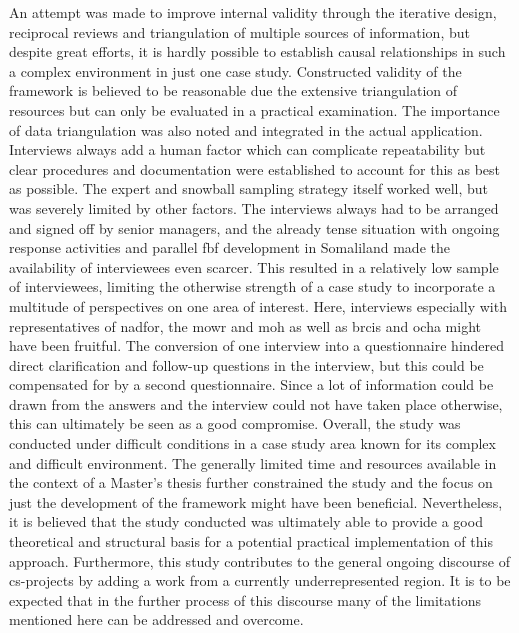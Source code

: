 An attempt was made to improve internal validity through the iterative design, reciprocal reviews and triangulation of multiple sources of information, but despite great efforts, it is hardly possible to establish causal relationships in such a complex environment in just one case study. Constructed validity of the framework is believed to be reasonable due the extensive triangulation of resources but can only be evaluated in a practical examination. The importance of data triangulation was also noted and integrated in the actual application. Interviews always add a human factor which can complicate repeatability but clear procedures and documentation were established to account for this as best as possible. The expert and snowball sampling strategy itself worked well, but was severely limited by other factors. The interviews always had to be arranged and signed off by senior managers, and the already tense situation with ongoing response activities and parallel \acrshort{fbf} development in Somaliland made the availability of interviewees even scarcer. This resulted in a relatively low sample of interviewees, limiting the otherwise strength of a case study to incorporate a multitude of perspectives on one area of interest. Here, interviews especially with representatives of \acrshort{nadfor}, the \acrshort{mowr} and \acrshort{moh} as well as \acrshort{brcis} and \acrshort{ocha} might have been fruitful. The conversion of one interview into a questionnaire hindered direct clarification and follow-up questions in the interview, but this could be compensated for by a second questionnaire. Since a lot of information could be drawn from the answers and the interview could not have taken place otherwise, this can ultimately be seen as a good compromise.\newline
Overall, the study was conducted under difficult conditions in a case study area known for its complex and difficult environment. The generally limited time and resources available in the context of a Master's thesis further constrained the study and the focus on just the development of the framework might have been beneficial. Nevertheless, it is believed that the study conducted was ultimately able to provide a good theoretical and structural basis for a potential practical implementation of this approach. Furthermore, this study contributes to the general ongoing discourse of \acrlong{cs}-projects by adding a work from a currently underrepresented region. It is to be expected that in the further process of this discourse many of the limitations mentioned here can be addressed and overcome.

